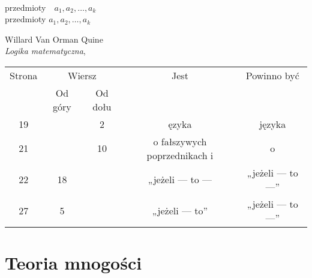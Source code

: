 \documentclass[a4paper,11pt]{article}
\numberwithin{equation}{section}
\begin{document}
\VerSpaceSix


\noindent
{} \\
\Jest przedmioty~~$a_{ 1 }, a_{ 2 }, \ldots, a_{ k }$ \\
\PowinnoByc przedmioty $a_{ 1 }, a_{ 2 }, \ldots, a_{ k }$ \\













\newpage

  Willard Van Orman Quine \\
  \textit{Logika matematyczna}, \cite{Quine-Logika-matematyczna-Wyd-1974}




\begin{center}

  \begin{tabular}{|c|c|c|c|c|}
    \hline
    Strona & \multicolumn{2}{c|}{Wiersz} & Jest
                              & Powinno być \\ \cline{2-3}
    & Od góry & Od dołu & & \\
    \hline
    19  & &  2 & ęzyka & języka \\
    21  & & 10 & o fałszywych poprzednikach i & o \\
    22  & 18 & & „jeżeli --- to --- & „jeżeli --- to ---” \\
    27  &  5 & & „jeżeli --- to” & „jeżeli --- to ---” \\
    \hline
  \end{tabular}

\end{center}

\VerSpaceSix











\newpage
\section{Teoria mnogości}
\end{document}
